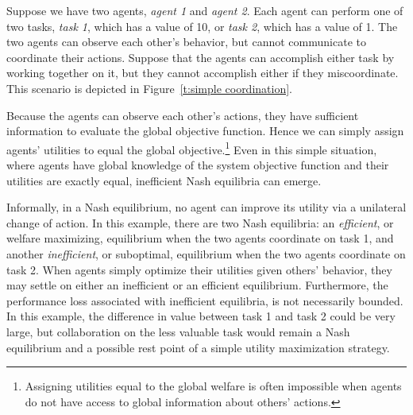 \begin{example}\label{e:interdependent utilities}
Suppose we have two agents, {\it agent 1} and {\it agent 2}. Each agent can perform one of two tasks, {\it task 1}, which has a value of 10, or {\it task 2}, which has a value of 1.  The two agents can observe each other's behavior, but cannot communicate to coordinate their actions. Suppose that the agents can accomplish either task by working together on it, but they cannot accomplish either if they miscoordinate. This scenario is depicted in Figure~\ref{t:simple coordination}.

Because the agents can observe each other's actions, they have sufficient information to evaluate the global objective function. Hence we can simply assign agents' utilities to equal the global objective.\footnote{Assigning utilities equal to the global welfare is often impossible when agents do not have access to global information about others' actions.} Even in this simple situation, where agents have global knowledge of the system objective function and their utilities are exactly equal, inefficient Nash equilibria can emerge.

Informally, in a Nash equilibrium, no agent can improve its utility via a unilateral change of action. In this example, there are two Nash equilibria: an {\it efficient}, or welfare maximizing, equilibrium when the two agents coordinate on task 1, and another {\it inefficient}, or suboptimal, equilibrium when the two agents coordinate on task 2. When agents simply optimize their utilities given others' behavior, they may settle on either an inefficient or an efficient equilibrium. Furthermore, the performance loss associated with inefficient equilibria, is not necessarily bounded. In this example, the difference in value between task 1 and task 2 could be very large, but collaboration on the less valuable task would remain a Nash equilibrium and a possible rest point of a simple utility maximization strategy.




\end{example}

